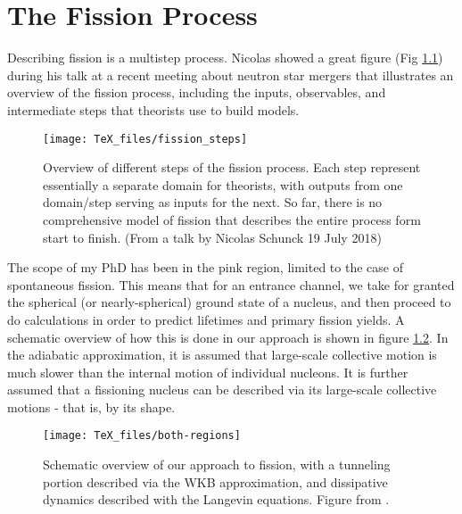 \chapter{The Fission Process}

\maketitle

Describing fission is a multistep process. Nicolas showed a great figure (Fig \ref{fig:fissionsteps}) during his talk at a recent meeting about neutron star mergers that illustrates an overview of the fission process, including the inputs, observables, and intermediate steps that theorists use to build models.

\begin{figure}
	\centering
	\texttt{[image: TeX\_files/fission\_steps]}
	\caption[Overview of different steps of the fission process.]{Overview of different steps of the fission process. Each step represent essentially a separate domain for theorists, with outputs from one domain/step serving as inputs for the next. So far, there is no comprehensive model of fission that describes the entire process form start to finish. (From a talk by Nicolas Schunck 19 July 2018)}
	\label{fig:fissionsteps}
\end{figure}

The scope of my PhD has been in the pink region, limited to the case of spontaneous fission. This means that for an entrance channel, we take for granted the spherical (or nearly-spherical) ground state of a nucleus, and then proceed to do calculations in order to predict lifetimes and primary fission yields. A schematic overview of how this is done in our approach is shown in figure \ref{fig:both-regions}. In the adiabatic approximation, it is assumed that large-scale collective motion is much slower than the internal motion of individual nucleons. It is further assumed that a fissioning nucleus can be described via its large-scale collective motions - that is, by its shape.

\begin{figure}
	\centering
	\texttt{[image: TeX\_files/both-regions]}
	\caption[Schematic overview of our approach to fission]{Schematic overview of our approach to fission, with a tunneling portion described via the WKB approximation, and dissipative dynamics described with the Langevin equations. Figure from \cite{Sadhukhan2016}.}
	\label{fig:both-regions}
\end{figure}

